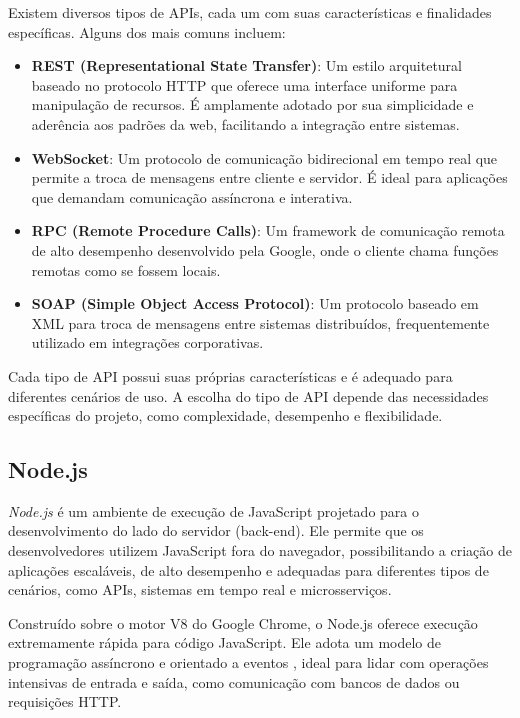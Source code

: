 Existem diversos tipos de APIs, cada um com suas características e finalidades específicas. Alguns dos mais comuns incluem:

\begin{itemize}
    \item \textbf{REST (Representational State Transfer)}: Um estilo arquitetural baseado no protocolo HTTP que oferece uma interface uniforme para manipulação de recursos. É amplamente adotado por sua simplicidade e aderência aos padrões da web, facilitando a integração entre sistemas.
    \item \textbf{WebSocket}: Um protocolo de comunicação bidirecional em tempo real que permite a troca de mensagens entre cliente e servidor. É ideal para aplicações que demandam comunicação assíncrona e interativa.
    \item \textbf{RPC (Remote Procedure Calls)}: Um framework de comunicação remota de alto desempenho desenvolvido pela Google, onde o cliente chama funções remotas como se fossem locais.
    \item \textbf{SOAP (Simple Object Access Protocol)}: Um protocolo baseado em XML para troca de mensagens entre sistemas distribuídos, frequentemente utilizado em integrações corporativas.
\end{itemize}

Cada tipo de API possui suas próprias características e é adequado para diferentes cenários de uso. A escolha do tipo de API depende das necessidades específicas do projeto, como complexidade, desempenho e flexibilidade.


\subsection{Node.js}


\emph{Node.js} é um ambiente de execução de JavaScript projetado para o desenvolvimento do lado do servidor (back-end). Ele permite que os desenvolvedores utilizem JavaScript fora do navegador, possibilitando a criação de aplicações escaláveis, de alto desempenho e adequadas para diferentes tipos de cenários, como APIs, sistemas em tempo real e microsserviços.

Construído sobre o motor V8 do Google Chrome, o Node.js oferece execução extremamente rápida para código JavaScript. Ele adota um modelo de programação assíncrono e orientado a eventos \cite{nodejs-about}, ideal para lidar com operações intensivas de entrada e saída, como comunicação com bancos de dados ou requisições HTTP.

